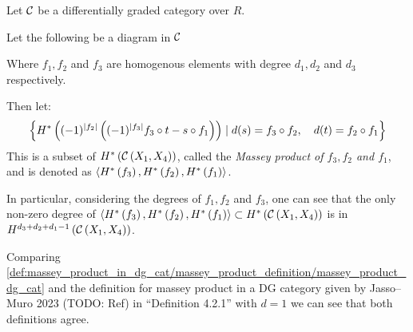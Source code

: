 \begin{definition}
    \label{def:massey_product_in_dg_cat/massey_product_definition/massey_product_dg_cat}
    Let \( {\mathcal{C}} \) be a differentially graded category over \( R \).

    Let the following be a diagram in \( {\mathcal{C}} \)
    \begin{center}
    \end{center}

    Where \( f_1, f_2 \) and \( f_3 \) are homogenous elements with degree \( d_1, d_2 \) and \( d_3 \) respectively.

    Then let:
    \[
        \left\{ 
            H^* \left( 
                (-1)^{\lvert f_2 \rvert} \left(  (-1)^{\lvert f_3 \rvert} f_3 \circ t - s \circ f_1  \right)
             \right)
            \mid
            d(s) = f_3 \circ f_2, \quad
            d(t) = f_2 \circ f_1
         \right\}
    \]
    This is a subset of \( H^* \left( {\mathcal{C}} \left( X_1, X_4 \right) \right) \), called the \emph{Massey product of \( f_3, f_2 \) and \( f_1 \)}, and is denoted as \( \langle H^* \left( f_3 \right), H^* \left( f_2 \right), H^* \left( f_1 \right)  \rangle \).
\end{definition}

\begin{remark}
    In particular, considering the degrees of \( f_1, f_2 \) and \( f_3 \), one can see that the only non-zero degree of \( \langle H^* \left( f_3 \right), H^* \left( f_2 \right), H^* \left( f_1 \right)  \rangle \subset H^* \left( {\mathcal{C}} \left( X_1, X_4 \right) \right) \) is in \( H^{d_3 + d_2 + d_1 - 1} \left( {\mathcal{C}} \left( X_1, X_4 \right) \right) \).
\end{remark}

\begin{remark}
    Comparing \autoref{def:massey_product_in_dg_cat/massey_product_definition/massey_product_dg_cat} and the definition for massey product in a DG category given by Jasso--Muro 2023 (TODO: Ref) in ``Definition 4.2.1'' with \( d = 1 \) we can see that both definitions agree.
\end{remark}

